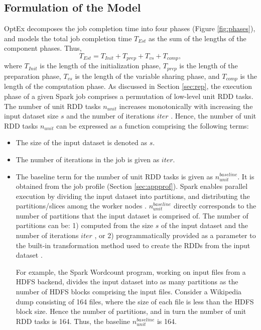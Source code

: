 \documentclass[conference]{IEEEtran}
\begin{document}
 \subsection{Formulation of the Model}\label{sec:formulation}
OptEx decomposes the job completion time into four phases (Figure \ref{fig:phases}), and
models the total job completion time $\mathit{T_{\mathit{Est}}}$ as the sum of the lengths of the component phases. Thus, \begin{equation}\label{eqn:est1}
 \mathit{T_{\mathit{Est}}}  =   \mathit{T_{\mathit{Init}}}  +    \mathit{T_{\mathit{prep}}} +  \mathit{T_{\mathit{vs}}}  +  \mathit{T_{\mathit{comp}}},
\end{equation} where $\mathit{T_{\mathit{Init}}}$ is the length of the initialization phase, ${T_{\mathit{prep}}}$ is  the length of the preparation phase, $\mathit{T_{\mathit{vs}}}$ is the length of the variable sharing phase, and $\mathit{T_{\mathit{comp}}}$  is the length of the computation phase.
As
   discussed in Section \ref{sec:rep}, the execution phase of a given Spark job comprises a permutation
 of low-level unit RDD tasks. The number  of unit RDD tasks $\mathit{n_{unit}}$ increases monotonically with increasing
 the input dataset size $s$ and the number of iterations $\mathit{iter}$ \cite{Zaharia:2012:RDD:2228298.2228301}.
  Hence, the number  of unit RDD tasks $\mathit{n_{unit}}$
can be expressed as a function comprising the following terms:
 \begin{itemize}
   \item  The size of the
   input dataset is denoted as $s$.
  \item The number of iterations  in the job is given as $\mathit{iter}$.
 \item The baseline term for the number of unit RDD tasks is given as $\mathit{n_{\mathit{unit}}^{\mathit{baseline}}}$. It is obtained from the job
 profile (Section \ref{sec:appprof}). Spark enables parallel execution by dividing the input dataset into partitions, and distributing the partitions/slices among the worker nodes  \cite{Zaharia:2012:RDD:2228298.2228301}.  $\mathit{n_{\mathit{unit}}^{\mathit{baseline}}}$ directly corresponds to the number of partitions that the input dataset is comprised of.
 The number of
 partitions can be: 1) computed from the size $s$ of the input dataset and the number of iterations $\mathit{iter}$ \cite{Zaharia:2012:RDD:2228298.2228301}, or
 2) programmatically provided as a parameter to the built-in transformation method used to create the RDDs
 from the input dataset \cite{Zaharia:2012:RDD:2228298.2228301}.
 \par For example, the Spark Wordcount program, working on input files from a HDFS backend,
 divides the input dataset into as many partitions as the number of HDFS blocks comprising the input files. Consider a Wikipedia dump \cite{snapnets} consisting of 164 files, where the
 size of each file is less than the HDFS block size. Hence the number of partitions, and in turn the number
 of unit RDD tasks is 164. Thus, the baseline $\mathit{n_{\mathit{unit}}^{\mathit{baseline}}}$ is 164.

\end{itemize}
\end{document}
